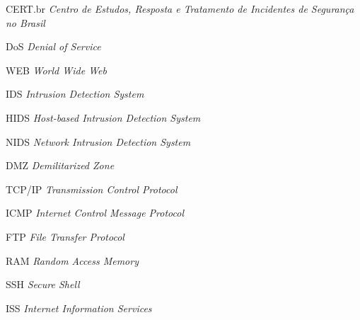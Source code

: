 \begin{siglas}
	\item[CERT.br] \textit{Centro de Estudos, Resposta e Tratamento de Incidentes de Segurança no Brasil}
	\item[DoS] \textit{Denial of Service}
	\item[WEB] \textit{World Wide Web}
	\item[IDS] \textit{Intrusion Detection System}
	\item[HIDS] \textit{Host-based Intrusion Detection System}
	\item[NIDS] \textit{Network Intrusion Detection System} 
	\item[DMZ] \textit{Demilitarized Zone}
	\item[TCP/IP] \textit{Transmission Control Protocol}
	\item[ICMP] \textit{Internet Control Message Protocol}
	\item[FTP] \textit{File Transfer Protocol}
	\item[RAM] \textit{Random Access Memory}
	\item[SSH] \textit{Secure Shell}
	\item[ISS] \textit{Internet Information Services}
\end{siglas}
